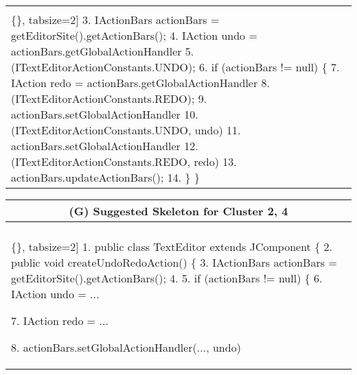 \begin{figure*}[!htb]
\begin{minipage}{0.5\textwidth}
\begin{tabular}{@{}p{}}
\begin{Verbatim}[commandchars=\\\{\}, tabsize=2]
3.   IActionBars actionBars = getEditorSite().getActionBars();
4.    IAction undo = actionBars.getGlobalActionHandler
5.      (ITextEditorActionConstants.UNDO);
6.    if (actionBars != null) \{
7.      IAction redo = actionBars.getGlobalActionHandler
8.        (ITextEditorActionConstants.REDO);             
9.     actionBars.setGlobalActionHandler
10.      (ITextEditorActionConstants.UNDO, undo)
11.    actionBars.setGlobalActionHandler
12.      (ITextEditorActionConstants.REDO, redo)   
13.    actionBars.updateActionBars();  
14.  \} \}
 \end{Verbatim}
      \vspace{-4mm}
  \\    
\end{tabular} 
\end{minipage}
 \begin{minipage}{0.5\textwidth}
\scriptsize 
\begin{tabular}{@{}p{}} 
 \hline 
  \multicolumn{1}{c}{(G) Suggested Skeleton for Cluster 2, 4} \\ \hline
  \vspace{-4mm}
\begin{Verbatim}[commandchars=\\\{\}, tabsize=2]
1. public class TextEditor extends JComponent \{
2.  public void createUndoRedoAction() \{
3.    IActionBars actionBars = getEditorSite().getActionBars();
4.
5.    if (actionBars != null) \{
6.      IAction undo = ...      

7.      IAction redo = ...
        
8.     actionBars.setGlobalActionHandler(..., undo)
     

\end{Verbatim}
\end{tabular}
\end{minipage}
\end{figure*}
